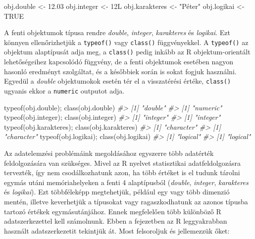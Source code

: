 \documentclass[
]{book}
\newenvironment{Shaded}{\begin{snugshade}}{\end{snugshade}}
\newcommand{\CommentTok}[1]{\textcolor[rgb]{0.56,0.35,0.01}{\textit{#1}}}
\newcommand{\ConstantTok}[1]{\textcolor[rgb]{0.00,0.00,0.00}{#1}}
\newcommand{\FloatTok}[1]{\textcolor[rgb]{0.00,0.00,0.81}{#1}}
\newcommand{\FunctionTok}[1]{\textcolor[rgb]{0.00,0.00,0.00}{#1}}
\newcommand{\NormalTok}[1]{#1}
\newcommand{\OtherTok}[1]{\textcolor[rgb]{0.56,0.35,0.01}{#1}}
\newcommand{\StringTok}[1]{\textcolor[rgb]{0.31,0.60,0.02}{#1}}
\begin{document}
\begin{Shaded}
\begin{Highlighting}[]
\NormalTok{obj.double     }\OtherTok{\textless{}{-}} \FloatTok{12.03}
\NormalTok{obj.integer    }\OtherTok{\textless{}{-}}\NormalTok{ 12L}
\NormalTok{obj.karakteres }\OtherTok{\textless{}{-}} \StringTok{"Péter"}
\NormalTok{obj.logikai    }\OtherTok{\textless{}{-}} \ConstantTok{TRUE}
\end{Highlighting}
\end{Shaded}

A fenti objektumok típusa rendre \emph{double}, \emph{integer}, \emph{karakteres} és \emph{logikai}. Ezt könnyen ellenőrizhetjük a \texttt{typeof()} vagy \texttt{class()} függvényekkel. A \texttt{typeof()} az objektum alaptípusát adja meg, a \texttt{class()} pedig inkább az R objektum-orientált lehetőségeihez kapcsolódó függvény, de a fenti objektumok esetében nagyon hasonló eredményt szolgáltat, és a későbbiek során is sokat fogjuk használni. Egyedül a \emph{double} objektumokok esetén tér el a visszatérési értéke, \texttt{class()} ugyanis ekkor a \texttt{numeric} outputot adja.

\begin{Shaded}
\begin{Highlighting}[]
\FunctionTok{typeof}\NormalTok{(obj.double);     }\FunctionTok{class}\NormalTok{(obj.double)}
\CommentTok{\#\textgreater{} [1] "double"}
\CommentTok{\#\textgreater{} [1] "numeric"}
\FunctionTok{typeof}\NormalTok{(obj.integer);    }\FunctionTok{class}\NormalTok{(obj.integer)}
\CommentTok{\#\textgreater{} [1] "integer"}
\CommentTok{\#\textgreater{} [1] "integer"}
\FunctionTok{typeof}\NormalTok{(obj.karakteres); }\FunctionTok{class}\NormalTok{(obj.karakteres)}
\CommentTok{\#\textgreater{} [1] "character"}
\CommentTok{\#\textgreater{} [1] "character"}
\FunctionTok{typeof}\NormalTok{(obj.logikai);    }\FunctionTok{class}\NormalTok{(obj.logikai)}
\CommentTok{\#\textgreater{} [1] "logical"}
\CommentTok{\#\textgreater{} [1] "logical"}
\end{Highlighting}
\end{Shaded}

Az adatelemzési problémáink megoldásához egyszerre több adatérték feldolgozására van szükséges. Mivel az R nyelvet statisztikai adatfeldolgozásra tervezték, így nem csodálkozhatunk azon, ha több értéket is el tudunk tárolni egymás utáni memóriahelyeken a fenti 4 alaptípusból (\emph{double}, \emph{integer}, \emph{karakteres} és \emph{logikai}). Ezt többféleképp megtehetjük, például egy vagy több dimenzió mentén, illetve keverhetjük a típusokat vagy ragaszkodhatunk az azonos típusba tartozó értékek egymásutánjához. Ennek megfelelően több különböző R adatszerkezettel kell számolnunk. Ebben a fejezetben az R leggyakrabban használt adatszerkezetit tekintjük át. Most felsoroljuk és jellemezzük őket:
\end{document}

